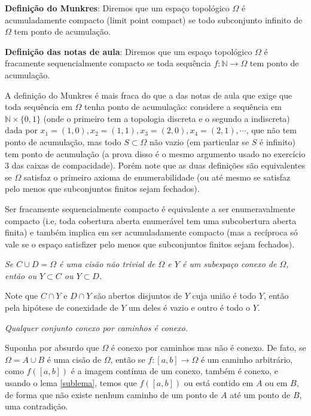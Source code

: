 \begin{oobs}
\textbf{Definição do Munkres}: Diremos que um espaço topológico $\Omega$ é acumuladamente compacto (limit point compact) se todo subconjunto infinito de $\Omega$ tem ponto de acumulação.
\end{oobs}
\begin{oobs}
\textbf{Definição das notas de aula}: Diremos que um espaço topológico $\Omega$ é fracamente sequencialmente compacto se toda sequência $f: \mathbb{N} \to \Omega $ tem ponto de acumulação.
\end{oobs}
\begin{oobs}
A definição do Munkres é mais fraca do que a das notas de aula que exige que toda sequência em $\Omega$ tenha ponto de acumulação: considere a sequência em $\mathbb{N} \times \{0,1 \}$ (onde o primeiro tem a topologia discreta e o segundo a indiscreta) dada por $x_1 = (1, 0), x_2 = (1, 1), x_3 = (2, 0), x_4 = (2, 1), \cdots$, que não tem ponto de acumulação, mas todo $S \subset \Omega$ não vazio (em particular se $S$ é infinito) tem ponto de acumulação (a prova disso é o mesmo argumento usado no exercício $3$ das caixas de compacidade). Porém note que as duas definições são equivalentes se $\Omega$ satisfaz o primeiro axioma de enumerabilidade (ou até mesmo se satisfaz pelo menos que subconjuntos finitos sejam fechados).
\end{oobs}
\begin{oobs}
Ser fracamente sequencialmente compacto é equivalente a ser enumeravalmente compacto (i.e, toda cobertura aberta enumerável tem uma subcobertura aberta finita) e também implica em ser acumuladamente compacto (mas a recíproca só vale se o espaço satisfizer pelo menos que subconjuntos finitos sejam fechados).
\end{oobs}
\begin{lema}\label{sublema}
\textit{Se $C \cup D = \Omega$ é uma cisão não trivial de $\Omega$ e $Y$ é um subespaço conexo de $\Omega$, então ou $Y \subset C$ ou $Y \subset D$. }
\end{lema}
\begin{demm}
Note que $C \cap Y$ e $D \cap Y$ são abertos disjuntos de $Y$ cuja união é todo $Y$, então pela hipótese de conexidade de $Y$ um deles é vazio e outro é todo o $Y$.
\end{demm}
\begin{lema}
\textit{Qualquer conjunto conexo por caminhos é conexo.}
\end{lema}
\begin{demm}
Suponha por absurdo que $\Omega$ é conexo por caminhos mas não é conexo. De fato, se $\Omega = A \cup B$ é uma cisão de $\Omega$, então se $f: [a, b] \to \Omega$ é um caminho arbitrário, como $f([a,b])$ é a imagem contínua de um conexo, também é conexo, e usando o lema \cref{sublema}, temos que $f([a,b])$ ou está contido em $A$ ou em $B$, de forma que não existe nenhum caminho de um ponto de $A$ até um ponto de $B$, uma contradição.
\end{demm}
